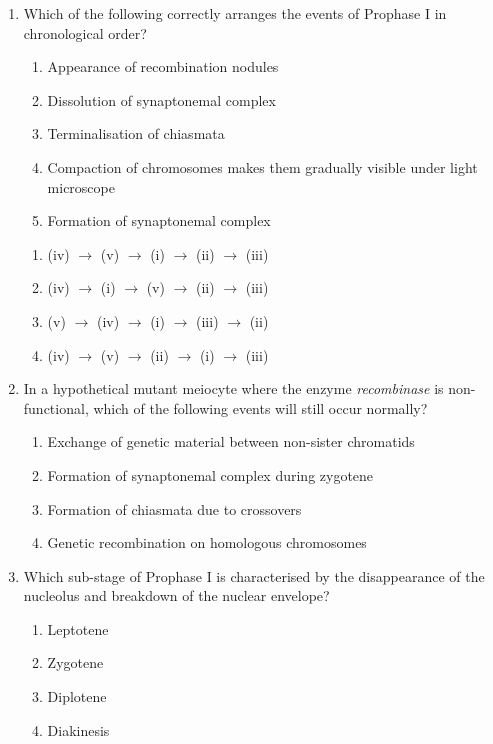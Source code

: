 \documentclass[11pt,a4paper]{article}
\begin{document}
\begin{enumerate}[label=\textbf{\arabic*.}]
\item Which of the following correctly arranges the events of Prophase I in chronological order?
\begin{enumerate}[label=(\roman*)]
    \item Appearance of recombination nodules
    \item Dissolution of synaptonemal complex
    \item Terminalisation of chiasmata
    \item Compaction of chromosomes makes them gradually visible under light microscope
    \item Formation of synaptonemal complex
\end{enumerate}
\begin{enumerate}[label=(\Alph*)]
    \item (iv) $\rightarrow$ (v) $\rightarrow$ (i) $\rightarrow$ (ii) $\rightarrow$ (iii)
    \item (iv) $\rightarrow$ (i) $\rightarrow$ (v) $\rightarrow$ (ii) $\rightarrow$ (iii)
    \item (v) $\rightarrow$ (iv) $\rightarrow$ (i) $\rightarrow$ (iii) $\rightarrow$ (ii)
    \item (iv) $\rightarrow$ (v) $\rightarrow$ (ii) $\rightarrow$ (i) $\rightarrow$ (iii)
\end{enumerate}

\item In a hypothetical mutant meiocyte where the enzyme \textit{recombinase} is non-functional, which of the following events will still occur normally?
\begin{enumerate}[label=(\Alph*)]
    \item Exchange of genetic material between non-sister chromatids
    \item Formation of synaptonemal complex during zygotene
    \item Formation of chiasmata due to crossovers
    \item Genetic recombination on homologous chromosomes
\end{enumerate}

\item Which sub-stage of Prophase I is characterised by the disappearance of the nucleolus and breakdown of the nuclear envelope?
\begin{enumerate}[label=(\Alph*)]
    \item Leptotene
    \item Zygotene
    \item Diplotene
    \item Diakinesis
\end{enumerate}


\end{enumerate}
\end{document}
